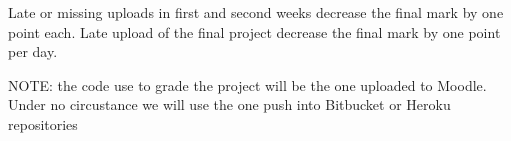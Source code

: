 \documentclass[12pt]{article} %
\begin{document}
Late or missing uploads in first and second weeks decrease the final mark by one point each.
Late upload of the final project decrease the final mark by one point per day.

NOTE: the code use to grade the project will be the one uploaded to Moodle. Under no circustance we will use the one push into Bitbucket or Heroku repositories
\end{document}
